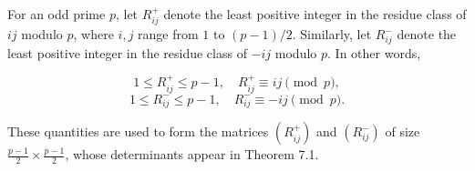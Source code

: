 For an odd prime $p$, let $R_{ij}^+$ denote the least positive integer in the residue class of $ij$ modulo $p$, where $i,j$ range from $1$ to $(p-1)/2$. Similarly, let $R_{ij}^-$ denote the least positive integer in the residue class of $-ij$ modulo $p$. In other words,

$$1 \leq R_{ij}^+ \leq p-1, \quad R_{ij}^+ \equiv ij \pmod{p},$$
$$1 \leq R_{ij}^- \leq p-1, \quad R_{ij}^- \equiv -ij \pmod{p}.$$

These quantities are used to form the matrices $(R_{ij}^+)$ and $(R_{ij}^-)$ of size $\frac{p-1}{2} \times \frac{p-1}{2}$, whose determinants appear in Theorem 7.1.
